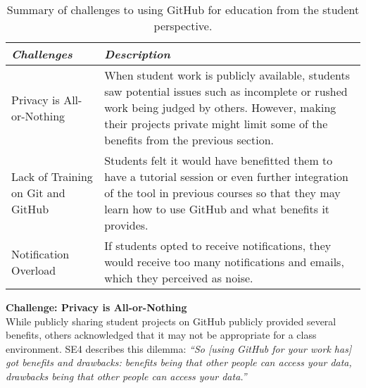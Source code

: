 \begin{table}[h]
    \vspace{1pt}
        \caption{Summary of challenges to using GitHub for education from the student perspective.}\label{table:interviews:students:challenges}
    \vspace{1pt}
    \begin{center}
        \begin{tabular}{ | m{3cm} | m{12cm} | }
            \hline
            \emph{Challenges} & \emph{Description} \\
            \hline
            Privacy is All-or-Nothing & When student work is publicly available, students saw potential issues such as incomplete or rushed work being judged by others. However, making their projects private might limit some of the benefits from the previous section. \\
            \hline
            Lack of Training on Git and GitHub & Students felt it would have benefitted them to have a tutorial session or even further integration of the tool in previous courses so that they may learn how to use GitHub and what benefits it provides. \\
            \hline
            Notification Overload & If students opted to receive notifications, they would receive too many notifications and emails, which they perceived as noise. \\
            \hline
        \end{tabular}
    \end{center}
\end{table}

\textbf{Challenge: Privacy is All-or-Nothing} \\
While publicly sharing student projects on GitHub publicly provided several benefits, others acknowledged that it may not be appropriate for a class environment. SE4 describes this dilemma: \textit{``So [using GitHub for your work has] got benefits and drawbacks: benefits being that other people can access your data, drawbacks being that other people can access your data.''}


